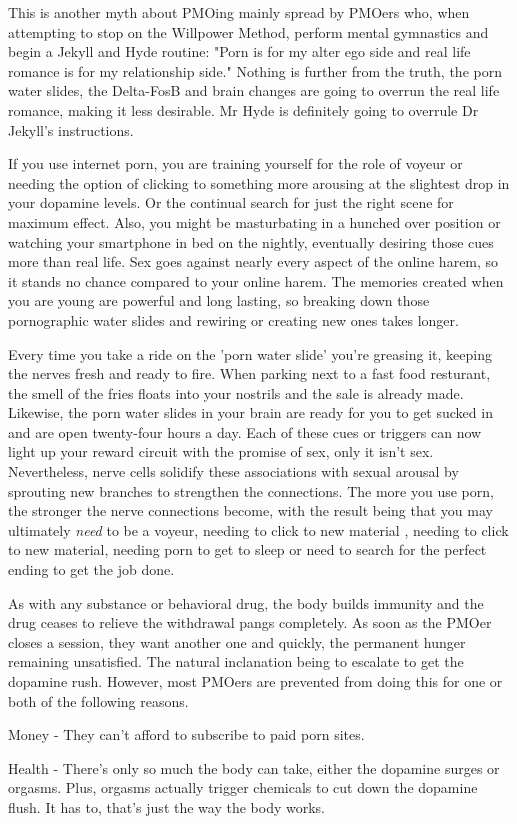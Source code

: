 \documentclass[easypeasy.tex]{subfiles}
\begin{document}
This is another myth about PMOing mainly spread by PMOers who, when attempting to stop on the Willpower Method, perform mental gymnastics and begin a Jekyll and Hyde routine: "Porn is for my alter ego side and real life romance is for my relationship side." Nothing is further from the truth, the porn water slides, the Delta-FosB and brain changes are going to overrun the real life romance, making it less desirable. Mr Hyde is definitely going to overrule Dr Jekyll's instructions.

If you use internet porn, you are training yourself for the role of voyeur or needing the option of clicking to something more arousing at the slightest drop in your dopamine levels. Or the continual search for just the right scene for maximum effect. Also, you might be masturbating in a hunched over position or watching your smartphone in bed on the nightly, eventually desiring those cues more than real life. Sex goes against nearly every aspect of the online harem, so it stands no chance compared to your online harem. The memories created when you are young are powerful and long lasting, so breaking down those pornographic water slides and rewiring or creating new ones takes longer.

Every time you take a ride on the 'porn water slide' you're greasing it, keeping the nerves fresh and ready to fire. When parking next to a fast food resturant, the smell of the fries floats into your nostrils and the sale is already made. Likewise, the porn water slides in your brain are ready for you to get sucked in and are open twenty-four hours a day. Each of these cues or triggers can now light up your reward circuit with the promise of sex, only it isn't sex. Nevertheless, nerve cells solidify these associations with sexual arousal by sprouting new branches to strengthen the connections. The more you use porn, the stronger the nerve connections become, with the result being that you may ultimately \textit{need} to be a voyeur, needing to click to new material , needing to click to new material, needing porn to get to sleep or need to search for the perfect ending to get the job done.

As with any substance or behavioral drug, the body builds immunity and the drug ceases to relieve the withdrawal pangs completely. As soon as the PMOer closes a session, they want another one and quickly, the permanent hunger remaining unsatisfied. The natural inclanation being to escalate to get the dopamine rush. However, most PMOers are prevented from doing this for one or both of the following reasons.
  \begin{description}
  \item Money - They can't afford to subscribe to paid porn sites.
  \item Health - There's only so much the body can take, either the dopamine surges or orgasms. Plus, orgasms actually trigger chemicals to cut down the dopamine flush. It has to, that's just the way the body works.
  \end{description}
\end{document}
